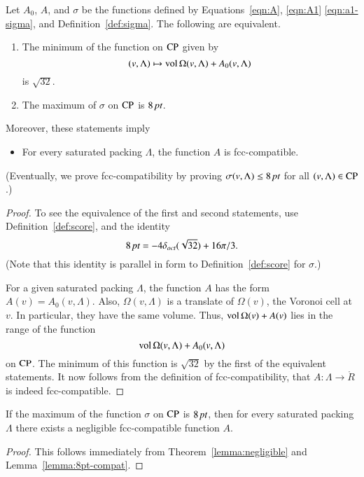 \begin{lemma}\label{lemma:8pt-compat}
Let $A_0$, $A$, and $\sigma$ be the functions defined by
Equations~\ref{eqn:A}, \ref{eqn:A1}  \ref{eqn:a1-sigma}, and
Definition~\ref{def:sigma}. The following are equivalent.
\begin{enumerate}
  \item The minimum of the function on ${\operatorname{CP}}$ given by
      $$(v,\Lambda)\mapsto {\operatorname{vol}}\,\Omega(v,\Lambda) + A_0(v,\Lambda)$$
is $\sqrt{32}$.
  \item The maximum of $\sigma$ on ${\operatorname{CP}}$ is $8\,\hbox{\it pt}$.
\end{enumerate}
Moreover, these statements imply
\begin{itemize}
  \item For every saturated packing $\Lambda$,
  the function $A$ is
  fcc-compatible.
\end{itemize}
\end{lemma}

(Eventually, we prove fcc-compatibility by proving
$\sigma(v,\Lambda)\le8\,\hbox{\it pt}$ for all $(v,\Lambda)\in{\operatorname{CP}}$.)

\begin{proof} To see the equivalence of the first and second statements,
use Definition~\ref{def:score},  and the identity
   $$8\,\hbox{\it pt} = -4\delta_{oct} (\sqrt{32}) + 16 \pi/3.$$
(Note that this identity is parallel in form to
Definition~\ref{def:score} for $\sigma$.)

For a given saturated packing $\Lambda$, the function $A$ has the
form $A(v) = A_0(v,\Lambda)$.  Also, $\Omega(v,\Lambda)$ is
a translate of $\Omega(v)$, the Voronoi cell at $v$.  In
particular, they have the same volume.  Thus,
${\operatorname{vol}}\,\Omega(v)+A(v)$ lies in the range of the function
   $${\operatorname{vol}}\,\Omega(v,\Lambda) + A_0(v,\Lambda)$$
on ${\operatorname{CP}}$.  The minimum of this function is $\sqrt{32}$ by the
first of the equivalent statements.  It now follows from the
definition of fcc-compatibility, that $A:\Lambda\to\ring{R}$ is
indeed fcc-compatible.
\end{proof}

\begin{theorem}\label{lemma:exista}
If the maximum of the function $\sigma$ on
${\operatorname{CP}}$ is $8\,\hbox{\it pt}$, then for every saturated packing $\Lambda$
there exists a negligible fcc-compatible function $A$.
\end{theorem}

\begin{proof} This follows immediately from Theorem~\ref{lemma:negligible}
and Lemma~\ref{lemma:8pt-compat}.
\end{proof}


